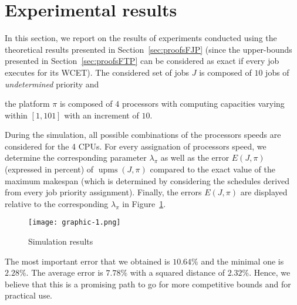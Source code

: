\documentclass[10pt,english,a4paper]{article}
\newtheorem{validity test}{Validity Test}
\newcommand{\upms}{\operatorname{upms}}
\begin{document}
\section{Experimental results}\label{Experimental results}

In this section, we report on the results of experiments conducted using the theoretical results presented in Section~\ref{sec:proofsFJP} (since the upper-bounds presented in Section~\ref{sec:proofsFTP} can be considered as exact if every job executes for its WCET).
The considered set of jobs $J$ is composed of $10$ jobs of \emph{undetermined} priority and \begin{comment}
\begin{table}[!h]
\centering
\begin{tabular}{| c | c | c | c | c |}
\hline
\multicolumn{5}{| c |}{\textbf{Job WCETs}} \\
\hline
$C_1$ & $C_2$ & $C_3$ & $C_4$ & $C_5$ \\
\hline
3896 & 3964 & 878 & 1378 & 2228 \\
\hline
$C_6$ & $C_7$ & $C_8$ & $C_9$ & $C_{10}$ \\
\hline
3612 & 1230 & 1232 & 1668 & 4672 \\
\hline
\end{tabular}
\caption{WCET of the considered jobs}
\label{tab:parameters}
\end{table}
\end{comment}
the platform $\pi$ is composed of $4$ processors with computing capacities varying within $\left[1, 101 \right]$ with an increment of $10$. 

During the simulation, all possible combinations of the processors speeds are considered for the 4 CPUs. For every assignation of processors speed, we determine the corresponding parameter $\lambda_{\pi}$ as well as the error $E(J,\pi)$ (expressed in percent) of $\upms(J, \pi)$ compared to the exact value of the maximum makespan (which is determined by considering the schedules derived from every job priority assignment). Finally, the errors $E(J,\pi)$ are displayed relative to the corresponding $\lambda_{\pi}$ in Figure~\ref{fig:experiment}. 

\begin{figure}[!h]
\centering
\texttt{[image: graphic-1.png]}
\caption{Simulation results}
\label{fig:experiment}
\end{figure}

The most important error that we obtained is $10.64\%$ and the minimal one is $2.28\%$. The average error is $7.78\%$ with a squared distance of $2.32\%$. Hence, we believe that this is a promising path to go for more competitive bounds and for practical use.
\end{document}
